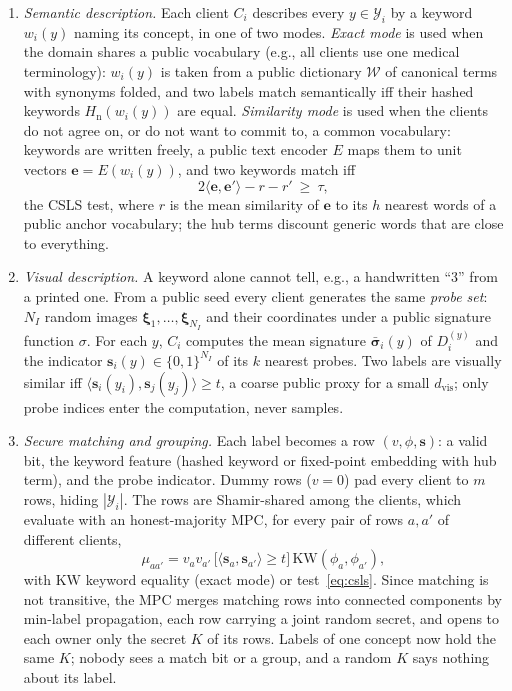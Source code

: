 \begin{enumerate}[label=(\arabic*),leftmargin=*,itemsep=2pt]
\item \emph{Semantic description.} Each client $C_i$ describes every $y\in\mathcal{Y}_i$ by a
keyword $w_i(y)$ naming its concept, in one of two modes.
\emph{Exact mode} is used when the domain shares a public vocabulary (e.g., all clients use one
medical terminology): $w_i(y)$ is taken from a public dictionary $\mathcal{W}$ of canonical terms
with synonyms folded, and two labels match semantically iff their hashed keywords
$H_{\mathrm n}(w_i(y))$ are equal.
\emph{Similarity mode} is used when the clients do not agree on, or do not want to commit to, a
common vocabulary: keywords are written freely, a public text encoder $E$ maps them to unit vectors
$\mathbf{e}=E(w_i(y))$, and two keywords match iff
\begin{equation}
  2\langle\mathbf{e},\mathbf{e}'\rangle-r-r'\ \ge\ \tau,
  \label{eq:csls}
\end{equation}
the CSLS test, where $r$ is the mean similarity of $\mathbf{e}$ to its $h$ nearest words of a public
anchor vocabulary; the hub terms discount generic words that are close to everything.

\item \emph{Visual description.} A keyword alone cannot tell, e.g., a handwritten ``3'' from a
printed one. From a public seed every client generates the same \emph{probe set}: $N_I$ random images
$\boldsymbol\xi_1,\dots,\boldsymbol\xi_{N_I}$ and their coordinates under a public signature function
$\sigma$. For each $y$, $C_i$ computes the mean signature $\bar{\boldsymbol\sigma}_i(y)$ of
$D_i^{(y)}$ and the indicator $\mathbf{s}_i(y)\in\{0,1\}^{N_I}$ of its $k$ nearest probes. Two labels
are visually similar iff $\langle\mathbf{s}_i(y_i),\mathbf{s}_j(y_j)\rangle\ge t$, a coarse public
proxy for a small $d_{\mathrm{vis}}$; only probe indices enter the computation, never samples.

\item \emph{Secure matching and grouping.} Each label becomes a row $(v,\phi,\mathbf{s})$: a valid
bit, the keyword feature (hashed keyword or fixed-point embedding with hub term), and the
probe indicator. Dummy rows ($v=0$) pad every client to $m$ rows, hiding $|\mathcal{Y}_i|$. The rows
are Shamir-shared among the clients, which evaluate with an honest-majority MPC, for every pair of
rows $a,a'$ of different clients,
\begin{equation}
  \mu_{aa'}=v_a v_{a'}\,\big[\langle\mathbf{s}_a,\mathbf{s}_{a'}\rangle\ge t\big]\,
  \mathrm{KW}(\phi_a,\phi_{a'}),
\end{equation}
with $\mathrm{KW}$ keyword equality (exact mode) or test~\eqref{eq:csls}. Since matching is
not transitive, the MPC merges matching rows into connected components by min-label propagation,
each row carrying a joint random secret, and opens to each owner only the secret $K$ of its rows.
Labels of one concept now hold the same $K$; nobody sees a match bit or a group, and a random $K$
says nothing about its label.


\end{enumerate}
